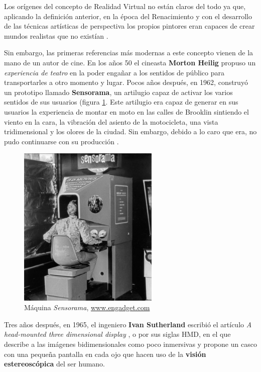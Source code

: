 Los orígenes del concepto de Realidad Virtual no están claros del todo ya que, aplicando la definición anterior, en la época del Renacimiento y con el desarrollo de las técnicas artísticas de perspectiva los propios pintores eran capaces de crear mundos realistas que no existían \cite{schn-17}. 

Sin embargo, las primeras referencias más modernas a este concepto vienen de la mano de un autor de cine. En los años 50 el cineasta \textbf{Morton Heilig} propuso un \textit{experiencia de teatro} en la poder engañar a los sentidos de  público para transportarles a otro momento y lugar. Pocos años después, en 1962, construyó un prototipo llamado \textbf{Sensorama}, un artilugio capaz de activar los varios sentidos de sus usuarios (figura \ref{fig:sensorama}. Este artilugio era capaz de generar en sus usuarios la experiencia de montar en moto en las calles de Brooklin sintiendo el viento en la cara, la vibración del asiento de la motocicleta, una vista tridimensional y los olores de la ciudad. Sin embargo, debido a lo caro que era, no pudo continuarse con su producción \cite{brock-16}.

\vspace{0.2cm}

\begin{figure}[!h]
    \begin{center}
        \includegraphics[width=0.6\textwidth]{imagenes/2/sensorama.jpg}
        \caption{Máquina \textit{Sensorama}, \url{www.engadget.com}}
        \label{fig:sensorama}
    \end{center}
\end{figure}

Tres años después, en 1965, el ingeniero \textbf{Ivan Sutherland} escribió el artículo \textit{A head-mounted three dimensional display} \cite{suth-65}, o por sus siglas \acs{HMD}, en el que describe a las imágenes bidimensionales como poco inmersivas y propone un casco con una pequeña pantalla en cada ojo que hacen uso de la \textbf{visión estereoscópica} del ser humano.

